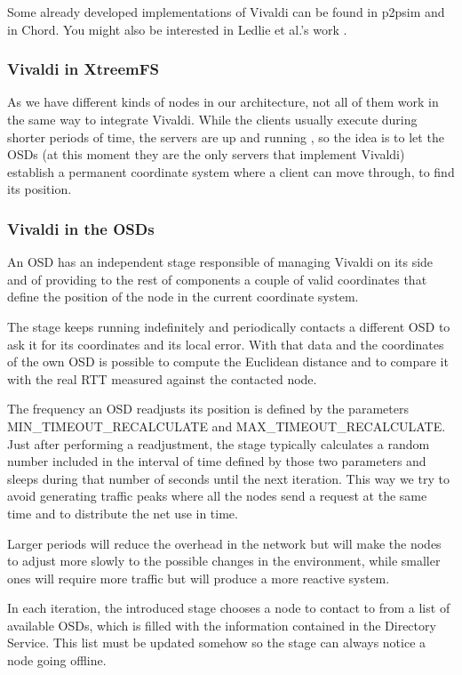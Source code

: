 Some already developed implementations of Vivaldi can be found in p2psim and in
Chord. You might also be interested in Ledlie et al.'s work \cite{ledlie2007ncw}.

\subsubsection{Vivaldi in XtreemFS}

As we have different kinds of nodes in our architecture, not all of them work in
the same way to integrate Vivaldi. While the clients usually execute during
shorter periods of time, the servers are up and running , so the
idea is to let the OSDs (at this moment they are the only
servers that implement Vivaldi) establish a permanent coordinate system where a
client can move through, to find its position.

\subsubsection{Vivaldi in the OSDs}

An OSD has an independent stage responsible of managing Vivaldi on its side and
of providing to the rest of components a couple of valid coordinates that define
the position of the node in the current coordinate system.

The stage keeps running indefinitely and periodically contacts a different OSD
to ask it for its coordinates and its local error. With that data and the
coordinates of the own OSD is possible to compute the Euclidean distance and to
compare it with the real RTT measured against the contacted node.

The frequency an OSD readjusts its position is defined by the parameters
MIN\_\-TIMEOUT\_\-RECALCULATE and MAX\-\_TIMEOUT\_\-RECALCULATE. Just after performing a
readjustment, the stage typically calculates a random number included in the
interval of time defined by those two parameters and sleeps during that number
of seconds until the next iteration. This way we try to avoid generating traffic
peaks where all the nodes send a request at the same time and to distribute the
net use in time.

Larger periods will reduce the overhead in the network but will make the nodes
to adjust more slowly to the possible changes in the environment, while smaller
ones will require more traffic but will produce a more reactive system.

In each iteration, the introduced stage chooses a node to contact to from a list
of available OSDs, which is filled with the information contained in the
Directory Service. This list must be updated somehow so the stage can always
notice a node going offline.

